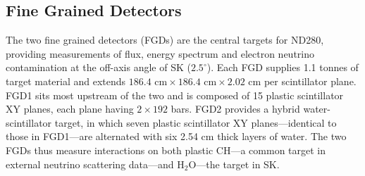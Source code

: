 \subsection{Fine Grained Detectors}
The two fine grained detectors (FGDs)\cite{t2k_fgd} are the central targets for ND280, providing measurements of flux, energy spectrum and electron neutrino contamination at the off-axis angle of SK ($2.5^\circ$). Each FGD supplies 1.1 tonnes of target material and extends $186.4\text{ cm}\times186.4\text{ cm}\times2.02\text{ cm}$ per scintillator plane. FGD1 sits most upstream of the two and is composed of 15 plastic scintillator XY planes, each plane having $2\times192$ bars. FGD2 provides a hybrid water-scintillator target, in which seven plastic scintillator XY planes---identical to those in FGD1---are alternated with six 2.54 cm thick layers of water. The two FGDs thus measure interactions on both plastic CH---a common target in external neutrino scattering data---and $\text{H}_2\text{O}$---the target in SK.


